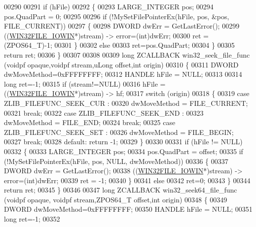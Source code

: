 \begin{DoxyCode}
00290 
00291     \textcolor{keywordflow}{if} (hFile)
00292     \{
00293         LARGE\_INTEGER pos;
00294         pos.QuadPart = 0;
00295 
00296         \textcolor{keywordflow}{if} (!MySetFilePointerEx(hFile, pos, &pos, FILE\_CURRENT))
00297         \{
00298             DWORD dwErr = GetLastError();
00299             ((\hyperlink{struct_w_i_n32_f_i_l_e___i_o_w_i_n}{WIN32FILE\_IOWIN}*)stream) -> error=(int)dwErr;
00300             ret = (ZPOS64\_T)-1;
00301         \}
00302         \textcolor{keywordflow}{else}
00303             ret=pos.QuadPart;
00304     \}
00305     \textcolor{keywordflow}{return} ret;
00306 \}
00307 
00308 
00309 \textcolor{keywordtype}{long} ZCALLBACK win32\_seek\_file\_func (voidpf opaque,voidpf stream,uLong offset,\textcolor{keywordtype}{int} origin)
00310 \{
00311     DWORD dwMoveMethod=0xFFFFFFFF;
00312     HANDLE hFile = NULL;
00313 
00314     \textcolor{keywordtype}{long} ret=-1;
00315     \textcolor{keywordflow}{if} (stream!=NULL)
00316         hFile = ((\hyperlink{struct_w_i_n32_f_i_l_e___i_o_w_i_n}{WIN32FILE\_IOWIN}*)stream) -> hf;
00317     \textcolor{keywordflow}{switch} (origin)
00318     \{
00319     \textcolor{keywordflow}{case} ZLIB\_FILEFUNC\_SEEK\_CUR :
00320         dwMoveMethod = FILE\_CURRENT;
00321         \textcolor{keywordflow}{break};
00322     \textcolor{keywordflow}{case} ZLIB\_FILEFUNC\_SEEK\_END :
00323         dwMoveMethod = FILE\_END;
00324         \textcolor{keywordflow}{break};
00325     \textcolor{keywordflow}{case} ZLIB\_FILEFUNC\_SEEK\_SET :
00326         dwMoveMethod = FILE\_BEGIN;
00327         \textcolor{keywordflow}{break};
00328     \textcolor{keywordflow}{default}: \textcolor{keywordflow}{return} -1;
00329     \}
00330 
00331     \textcolor{keywordflow}{if} (hFile != NULL)
00332     \{
00333         LARGE\_INTEGER pos;
00334         pos.QuadPart = offset;
00335         \textcolor{keywordflow}{if} (!MySetFilePointerEx(hFile, pos, NULL, dwMoveMethod))
00336         \{
00337             DWORD dwErr = GetLastError();
00338             ((\hyperlink{struct_w_i_n32_f_i_l_e___i_o_w_i_n}{WIN32FILE\_IOWIN}*)stream) -> error=(int)dwErr;
00339             ret = -1;
00340         \}
00341         \textcolor{keywordflow}{else}
00342             ret=0;
00343     \}
00344     \textcolor{keywordflow}{return} ret;
00345 \}
00346 
00347 \textcolor{keywordtype}{long} ZCALLBACK win32\_seek64\_file\_func (voidpf opaque, voidpf stream,ZPOS64\_T offset,\textcolor{keywordtype}{int} origin)
00348 \{
00349     DWORD dwMoveMethod=0xFFFFFFFF;
00350     HANDLE hFile = NULL;
00351     \textcolor{keywordtype}{long} ret=-1;
00352 

\end{DoxyCode}
